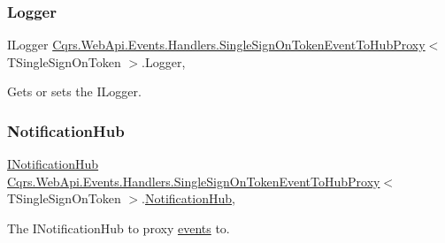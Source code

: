 \subsubsection{\texorpdfstring{Logger}{Logger}}
{\footnotesize\ttfamily I\+Logger \hyperlink{classCqrs_1_1WebApi_1_1Events_1_1Handlers_1_1SingleSignOnTokenEventToHubProxy}{Cqrs.\+Web\+Api.\+Events.\+Handlers.\+Single\+Sign\+On\+Token\+Event\+To\+Hub\+Proxy}$<$ T\+Single\+Sign\+On\+Token $>$.Logger\hspace{0.3cm}{\ttfamily [get]}, {\ttfamily [protected]}}



Gets or sets the I\+Logger. 

\mbox{\label{classCqrs_1_1WebApi_1_1Events_1_1Handlers_1_1SingleSignOnTokenEventToHubProxy_a9621749560e567a6252f3d7e2328174d_a9621749560e567a6252f3d7e2328174d}} 
\subsubsection{\texorpdfstring{Notification\+Hub}{NotificationHub}}
{\footnotesize\ttfamily \hyperlink{interfaceCqrs_1_1WebApi_1_1SignalR_1_1Hubs_1_1INotificationHub}{I\+Notification\+Hub} \hyperlink{classCqrs_1_1WebApi_1_1Events_1_1Handlers_1_1SingleSignOnTokenEventToHubProxy}{Cqrs.\+Web\+Api.\+Events.\+Handlers.\+Single\+Sign\+On\+Token\+Event\+To\+Hub\+Proxy}$<$ T\+Single\+Sign\+On\+Token $>$.\hyperlink{classCqrs_1_1WebApi_1_1SignalR_1_1Hubs_1_1NotificationHub}{Notification\+Hub}\hspace{0.3cm}{\ttfamily [get]}, {\ttfamily [protected]}}



The I\+Notification\+Hub to proxy \hyperlink{}{events} to. 

